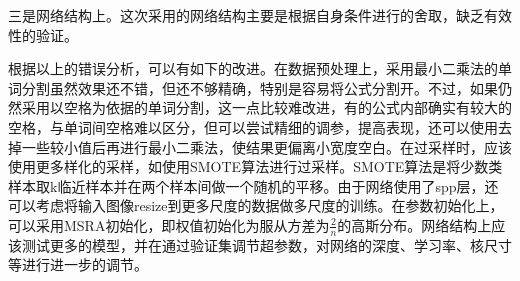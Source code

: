 三是网络结构上。这次采用的网络结构主要是根据自身条件进行的舍取，缺乏有效性的验证。

根据以上的错误分析，可以有如下的改进。在数据预处理上，采用最小二乘法的单词分割虽然效果还不错，但还不够精确，特别是容易将公式分割开。不过，如果仍然采用以空格为依据的单词分割，这一点比较难改进，有的公式内部确实有较大的空格，与单词间空格难以区分，但可以尝试精细的调参，提高表现，还可以使用去掉一些较小值后再进行最小二乘法，使结果更偏离小宽度空白。在过采样时，应该使用更多样化的采样，如使用SMOTE算法进行过采样。SMOTE算法是将少数类样本取k临近样本并在两个样本间做一个随机的平移。由于网络使用了spp层，还可以考虑将输入图像resize到更多尺度的数据做多尺度的训练。在参数初始化上，可以采用MSRA初始化，即权值初始化为服从方差为$\frac 2 n$的高斯分布。\cite{msra}网络结构上应该测试更多的模型，并在通过验证集调节超参数，对网络的深度、学习率、核尺寸等进行进一步的调节。